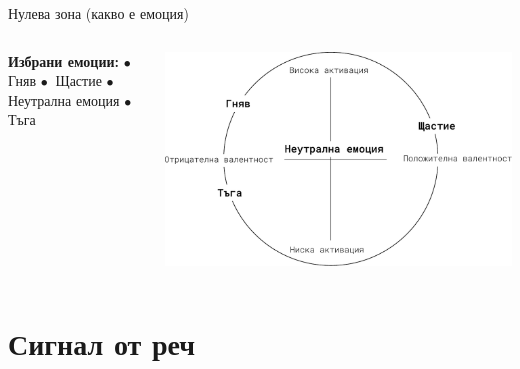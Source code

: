 \documentclass[9pt]{beamer}
\begin{document}
    \begin{frame}{Нулева зона (какво е емоция)}
        \begin{columns}[T] %
            \begin{column}{.38\textwidth}
                \textbf{Избрани емоции:}
                \vspace{1cm} \leavevmode \newline
                $\bullet\ $ Гняв
                \vspace{1cm} \leavevmode \newline
                $\bullet\ $ Щастие
                \vspace{1cm} \leavevmode \newline
                $\bullet\ $ Неутрална емоция
                \vspace{1cm} \leavevmode \newline
                $\bullet\ $ Тъга
            \end{column}%
            \hfill%
            \begin{column}{.60\textwidth}
                \vspace{1cm}
                \begin{center}
                    \includegraphics[width=\textwidth]{valence_arousal_ahns}%
                \end{center}
            \end{column}%
        \end{columns}
    \end{frame}

    \section{Сигнал от реч}
\end{document}
